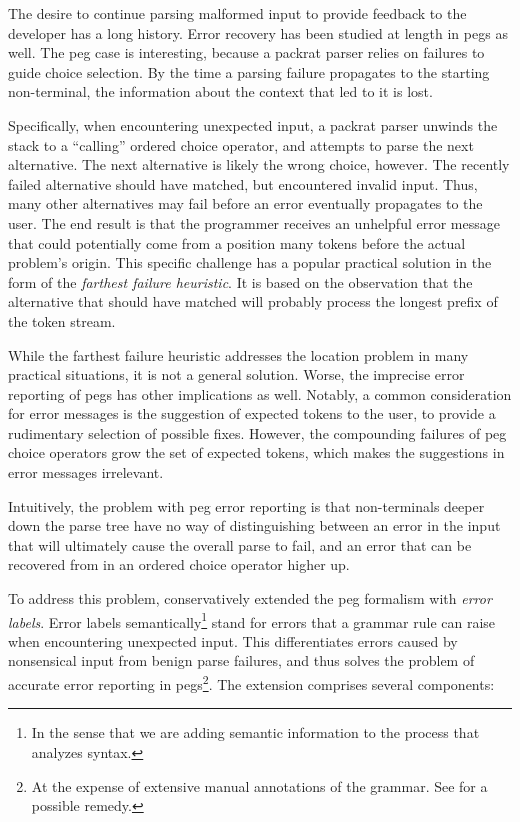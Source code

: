 The desire to continue parsing malformed input to provide feedback to the
developer has a long history\cite{graham1975practical}. Error recovery has been
studied at length in \acrlong{peg}s as well\cite{redziejowski2009mouse,
maidl2013exception, demedeiros2016parsing, demedeiros2018syntax,
demedeiros2020automatic}. The \acrshort{peg} case is interesting, because a
packrat parser relies on failures to guide choice selection. By the time a
parsing failure propagates to the starting non-terminal, the information about
the context that led to it is lost.

Specifically, when encountering unexpected input, a packrat parser unwinds the
stack to a ``calling'' ordered choice operator, and attempts to parse the next
alternative. The next alternative is likely the wrong choice, however. The
recently failed alternative should have matched, but encountered invalid input.
Thus, many other alternatives may fail before an error eventually propagates to
the user. The end result is that the programmer receives an unhelpful error
message that could potentially come from a position many tokens before the
actual problem's origin. This specific challenge has a popular practical
solution in the form of the \emph{farthest failure
heuristic}\cite{ford2002packrat_non_func}. It is based on the observation that
the alternative that should have matched will probably process the longest
prefix of the token stream.

While the farthest failure heuristic addresses the location problem in many
practical situations, it is not a general solution. Worse, the imprecise error
reporting of \acrshort{peg}s has other implications as well. Notably, a common
consideration for error messages is the suggestion of expected tokens to the
user, to provide a rudimentary selection of possible fixes. However, the
compounding failures of \acrshort{peg} choice operators grow the set of expected
tokens, which makes the suggestions in error messages irrelevant.

Intuitively, the problem with \acrshort{peg} error reporting is that
non-terminals deeper down the parse tree have no way of distinguishing between
an error in the input that will ultimately cause the overall parse to fail, and
an error that can be recovered from in an ordered choice operator higher up.

To address this problem, \citeauthor{maidl2013exception} conservatively extended
the \acrshort{peg} formalism with \emph{error labels}\cite{maidl2013exception}.
Error labels semantically\footnote{In the sense that we are adding semantic
information to the process that analyzes syntax.} stand for errors that a
grammar rule can raise when encountering unexpected input. This differentiates
errors caused by nonsensical input from benign parse failures, and thus solves
the problem of accurate error reporting in \acrlong{peg}s\footnote{At the
expense of extensive manual annotations of the grammar. See
\cite{demedeiros2020automatic} for a possible remedy.}. The extension comprises
several components:

